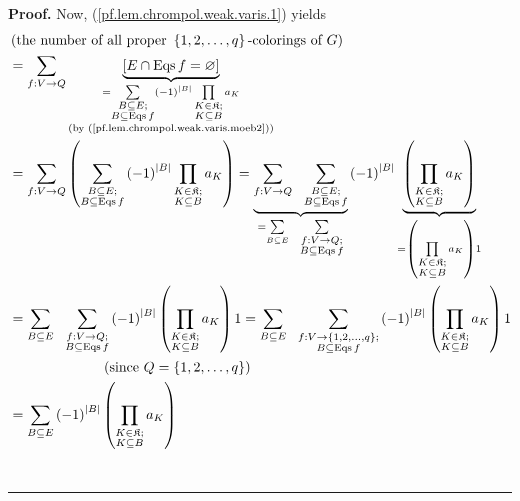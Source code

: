 \documentclass[numbers=enddot,12pt,final,onecolumn,notitlepage]{scrartcl}%
\theoremstyle{definition}
\newenvironment{proof}[1][Proof]{\noindent\textbf{#1.} }{\ \rule{0.5em}{0.5em}}
\newenvironment{verlong}{}{}
\let\sumnonlimits\sum
\let\prodnonlimits\prod
\renewcommand{\sum}{\sumnonlimits\limits}
\renewcommand{\prod}{\prodnonlimits\limits}
\begin{document}
\begin{verlong}
\begin{proof}
Now, (\ref{pf.lem.chrompol.weak.varis.1}) yields%
\begin{align*}
&  \left(  \text{the number of all proper }\left\{  1,2,\ldots,q\right\}
\text{-colorings of }G\right) \\
&  =\sum_{f:V\rightarrow Q}\underbrace{\left[  E\cap\operatorname*{Eqs}%
f=\varnothing\right]  }_{\substack{=\sum_{\substack{B\subseteq E;\\B\subseteq
\operatorname*{Eqs}f}}\left(  -1\right)  ^{\left\vert B\right\vert }%
\prod_{\substack{K\in\mathfrak{K};\\K\subseteq B}}a_{K}\\\text{(by
(\ref{pf.lem.chrompol.weak.varis.moeb2}))}}}\\
&  =\sum_{f:V\rightarrow Q}\left(  \sum_{\substack{B\subseteq E;\\B\subseteq
\operatorname*{Eqs}f}}\left(  -1\right)  ^{\left\vert B\right\vert }%
\prod_{\substack{K\in\mathfrak{K};\\K\subseteq B}}a_{K}\right)
=\underbrace{\sum_{f:V\rightarrow Q}\ \ \sum_{\substack{B\subseteq
E;\\B\subseteq\operatorname*{Eqs}f}}}_{=\sum_{B\subseteq E}\ \ \sum
_{\substack{f:V\rightarrow Q;\\B\subseteq\operatorname*{Eqs}f}}}\left(
-1\right)  ^{\left\vert B\right\vert }\underbrace{\left(  \prod
_{\substack{K\in\mathfrak{K};\\K\subseteq B}}a_{K}\right)  }_{=\left(
\prod_{\substack{K\in\mathfrak{K};\\K\subseteq B}}a_{K}\right)  1}\\
&  =\sum_{B\subseteq E}\ \ \sum_{\substack{f:V\rightarrow Q;\\B\subseteq
\operatorname*{Eqs}f}}\left(  -1\right)  ^{\left\vert B\right\vert }\left(
\prod_{\substack{K\in\mathfrak{K};\\K\subseteq B}}a_{K}\right)  1=\sum
_{B\subseteq E}\ \ \sum_{\substack{f:V\rightarrow\left\{  1,2,\ldots
,q\right\}  ;\\B\subseteq\operatorname*{Eqs}f}}\left(  -1\right)  ^{\left\vert
B\right\vert }\left(  \prod_{\substack{K\in\mathfrak{K};\\K\subseteq B}%
}a_{K}\right)  1\\
&  \ \ \ \ \ \ \ \ \ \ \ \ \ \ \ \ \ \ \ \ \left(  \text{since }Q=\left\{
1,2,\ldots,q\right\}  \right) \\
&  =\sum_{B\subseteq E}\left(  -1\right)  ^{\left\vert B\right\vert }\left(
\prod_{\substack{K\in\mathfrak{K};\\K\subseteq B}}a_{K}\right)

\end{align*}
\end{proof}
\end{verlong}
\end{document}
